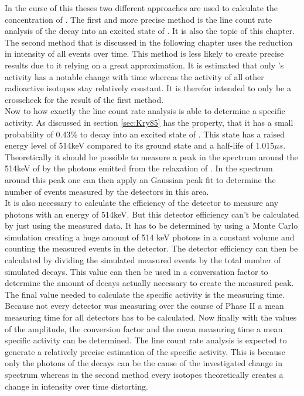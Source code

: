 \documentclass[encoding=utf8,british]{tumphthesis}
\begin{document}
In the curse of this theses two different approaches are used to calculate the concentration of \Kr. 
The first and more precise method is the line count rate analysis of the \Kr decay into an excited state of . 
It is also the topic of this chapter.
The second method that is discussed in the following chapter uses the reduction in intensity of all events over time. 
This method is less likely to create precise results due to it relying on a great approximation.
It is estimated that only \Kr's activity has a notable change with time whereas the activity of all other radioactive isotopes stay relatively constant. 
It is therefor intended to only be a crosscheck for the result of the first method.
\\

Now to how exactly the line count rate analysis is able to determine a specific activity.
As discussed in section \ref{sec:Kry85} has \Kr the property, that it has a small probability of 0.43\% to decay into an excited state of . 
This state has a raised energy level of 514keV compared to its ground state and a half-life of 1.015\(\unit{\mu s}\). 
Theoretically it should be possible to measure a peak in the spectrum around the 514keV of by the photons emitted from the relaxation of .
In the spectrum around this peak one can then apply an Gaussian peak fit to determine the number of events measured by the detectors in this area. 
\\

It is also necessary to calculate the efficiency of the detector to measure any photons with an energy of 514keV.
But this detector efficiency can't be calculated by just using the measured data.
It has to be determined by using a Monte Carlo simulation creating a huge amount of 514 keV photons in a constant volume and counting the measured events in the detector. 
The detector efficiency can then be calculated by dividing the simulated measured events by the total number of simulated decays.
This value can then be used in a conversation factor to determine the amount of decays actually necessary to create the measured peak.
\\

The final value needed to calculate the specific activity is the measuring time.
Because not every detector was measuring over the course of Phase II a mean measuring time for all detectors has to be calculated.
Now finally with the values of the amplitude, the conversion factor and the mean measuring time a mean specific activity can be determined. 
The line count rate analysis is expected to generate a relatively precise estimation of the specific activity.
This is because only the photons of the \Kr decays can be the cause of the investigated change in spectrum whereas in the second method every isotopes theoretically creates a change in intensity over time distorting.
\\ 
\end{document}
